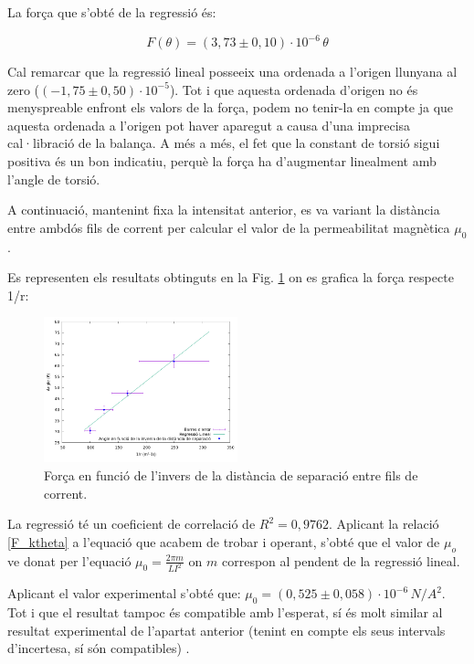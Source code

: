 \documentclass[11pt]{article}
\numberwithin{equation}{section}
\numberwithin{figure}{section}
\numberwithin{table}{section}
\begin{document}
La força que s’obté de la regressió és:

\begin{equation}\label{F_ktheta}
    F(\theta) = (3,73 \pm 0,10) \cdot 10^{-6}\, \theta
\end{equation}

Cal remarcar que la regressió lineal posseeix una ordenada a l’origen llunyana al zero ($(-1,75 \pm 0,50)·10^{-5}$). Tot i que aquesta ordenada d’origen no és menyspreable enfront els valors de la força, podem no tenir-la en compte ja que aquesta ordenada a l'origen pot haver aparegut a causa d’una imprecisa cal·libració de la balança. A més a més, el fet que la constant de torsió sigui positiva és un bon indicatiu, perquè la força ha d’augmentar linealment amb l’angle de torsió.

A continuació, mantenint fixa la intensitat anterior, es va variant la distància entre ambdós fils de corrent per calcular el valor de la permeabilitat magnètica $\mu_0$. 

Es representen els resultats obtinguts en la Fig. \ref{fig: PR2_regr_thetavsr} on es grafica la força respecte 1/r:

\begin{figure}[H]
    \centering
    \includegraphics[width=0.5\textwidth]{PR2_regr_thetavsr.png}
    \caption{Força en funció de l’invers de la distància de separació entre fils de corrent.}
    \label{fig: PR2_regr_thetavsr}
\end{figure}

La regressió té un coeficient de correlació de $R^2 = 0,9762$.
Aplicant la relació \eqref{F_ktheta} a l'equació que acabem de trobar i operant, s’obté que el valor de $\mu_o$ ve donat per l’equació $\mu_0 = \frac{2πm}{LI^2}$ on $m$ correspon al pendent de la regressió lineal. 

Aplicant el valor experimental s’obté que: $\mu_0 = (0,525 \pm 0,058) \cdot 10^{-6}\, N/A^2$. Tot i que el resultat tampoc és compatible amb l’esperat, sí és molt similar al resultat experimental de l’apartat anterior (tenint en compte els seus intervals d'incertesa, sí són compatibles) . 
\end{document}
